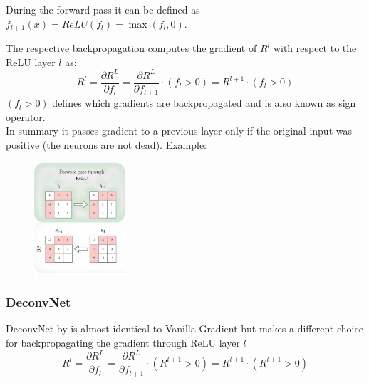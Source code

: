 During the forward pass it can be defined as $f_{l+1}(x)=ReLU(f_l)=\max(f_l, 0)$.

The respective backpropagation computes the gradient of $R^l$ with respect to the ReLU layer $l$ as:
\begin{equation*}
    R^l=\frac{\partial R^{L}}{\partial f_l}=\frac{\partial R^{L}}{\partial f_{l+1}}\cdot (f_l>0)=R^{l+1}\cdot (f_l>0)
\end{equation*}
$(f_l>0)$ defines which gradients are backpropagated and is also known as sign operator.\\
In summary it passes gradient to a previous layer only if the original input was positive (the neurons are not dead).
\newpage
Example:
\begin{figure}[H]
    \includegraphics[width=0.3\textwidth]{img/backprop_relu.png}
    \centering
\end{figure}

\subsubsection{DeconvNet}
DeconvNet by \cite{DBLP:conf/eccv/ZeilerF14} is almost identical to Vanilla Gradient but makes a
different choice for backpropagating the gradient through ReLU layer $l$
\begin{equation*}
    R^l=\frac{\partial R^{L}}{\partial f_l}=\frac{\partial R^{L}}{\partial f_{l+1}}\cdot (R^{l+1}>0)=R^{l+1}\cdot (R^{l+1}>0)
\end{equation*}

